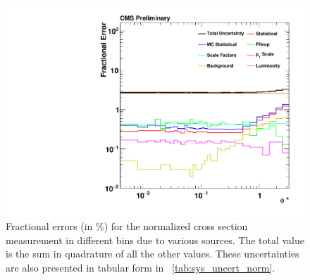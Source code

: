 \begin{figure}[!p]
    \centering
    \includegraphics[width=\textwidth]{figures/data_uncertainty_absolute.pdf}
    \caption[
        Fractional errors (in \%) for the normalized cross section measurement.
    ]{
        Fractional errors (in \%) for the normalized cross section measurement in
        different \phistar bins due to various sources. The total value is the
        sum in quadrature of all the other values. These uncertainties are also
        presented in tabular form in \TAB~\ref{tab:sys_uncert_norm}.
    }
    \label{fig:sys_uncert_norm}
\end{figure}
